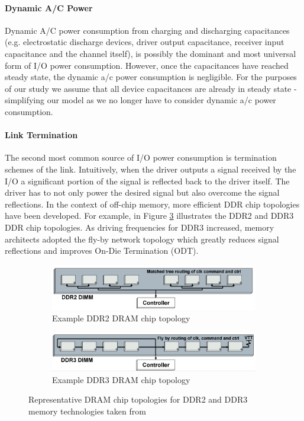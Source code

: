 \paragraph{Dynamic A/C Power} Dynamic A/C power consumption from charging and
discharging capacitances (e.g. electrostatic discharge devices, driver output
capacitance, receiver input capacitance and the channel itself), is possibly
the dominant and most universal form of I/O power consumption. However, once
the capacitances have reached steady state, the dynamic a/c power consumption
is negligible. For the purposes of our study we assume that all device
capacitances are already in steady state - simplifying our model as we no
longer have to consider dynamic a/c power consumption.

\paragraph{Link Termination} The second most common source of I/O power
consumption is termination schemes of the link. Intuitively, when the driver
outputs a signal received by the I/O a significant portion of the signal is
reflected back to the driver itself. The driver has to not only power the
desired signal but also overcome the signal reflections. In the context of
off-chip memory, more efficient DDR chip topologies have been developed. For
example, in Figure \ref{dram-chips} illustrates the DDR2 and DDR3 DDR chip
topologies. As driving frequencies for DDR3 increased, memory architects
adopted the fly-by network topology which greatly reduces signal reflections
and improves On-Die Termination (ODT).

\begin{figure}[!htb]
  \centering
  \begin{subfigure}[b]{0.4\textwidth}
    \includegraphics[width=\textwidth]{figs/ddr2-topology}
    \caption{Example DDR2 DRAM chip topology}
    \label{fig:ddr2-chips}
  \end{subfigure}

  \begin{subfigure}[b]{0.4\textwidth}
    \includegraphics[width=\textwidth]{figs/ddr3-topology}
    \caption{Example DDR3 DRAM chip topology}
    \label{fig:ddr3-chips}
  \end{subfigure}
  \caption{Representative DRAM chip topologies for DDR2 and DDR3 memory
  technologies taken from \cite{ddr-design}}
  \label{dram-chips}
\end{figure}

